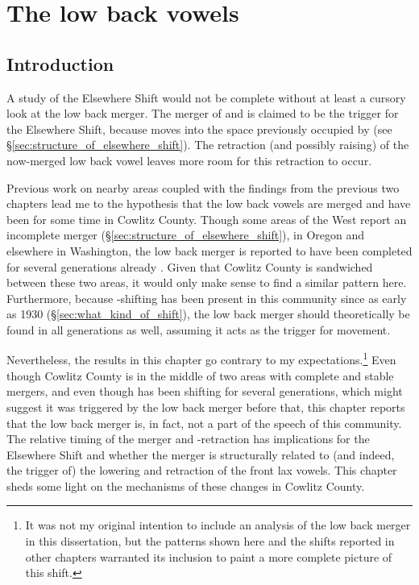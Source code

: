 \chapter{The low back vowels}
\label{ch:low_back}

\section{Introduction}

A study of the Elsewhere Shift would not be complete without at least a cursory look at the low back merger. The merger of \lot and \thought is claimed to be the trigger for the Elsewhere Shift, because \trap moves into the space previously occupied by \lot (see \S\ref{sec:structure_of_elsewhere_shift}). The retraction (and possibly raising) of the now-merged low back vowel leaves more room for this retraction to occur.

Previous work on nearby areas coupled with the findings from the previous two chapters lead me to the hypothesis that the low back vowels are merged and have been for some time in Cowlitz County. Though some areas of the West report an incomplete merger (\S\ref{sec:structure_of_elsewhere_shift}), in Oregon and elsewhere in Washington, the low back merger is reported to have been completed for several generations already \citep{mclarty_etal_2016, wassink_2016_pads}. Given that Cowlitz County is sandwiched between these two areas, it would only make sense to find a similar pattern here. Furthermore, because \bat-shifting has been present in this community since as early as 1930 (\S\ref{sec:what_kind_of_shift}), the low back merger should theoretically be found in all generations as well, assuming it acts as the trigger for \bat movement.

Nevertheless, the results in this chapter go contrary to my expectations.\footnote{It was not my original intention to include an analysis of the low back merger in this dissertation, but the patterns shown here and the shifts reported in other chapters warranted its inclusion to paint a more complete picture of this shift.} Even though Cowlitz County is in the middle of two areas with complete and stable mergers, and even though \bat has been shifting for several generations, which might suggest it was triggered by the low back merger before that, this chapter reports that the low back merger is, in fact, not a part of the speech of this community. The relative timing of the merger and \bat-retraction has implications for the Elsewhere Shift and whether the merger is structurally related to (and indeed, the trigger of) the lowering and retraction of the front lax vowels. This chapter sheds some light on the mechanisms of these changes in Cowlitz County.


